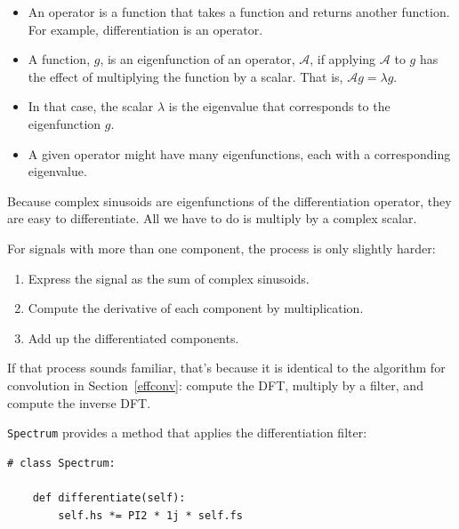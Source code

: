 \documentclass[12pt]{book}
\begin{document}
\newcommand{\op}{\mathcal{A}}

\begin{itemize}

\item An operator is a function that takes a function and returns
another function.  For example, differentiation is an operator.

\item A function, $g$, is an eigenfunction of an operator, $\op$, if
applying $\op$ to $g$ has the effect of multiplying the function by
a scalar.  That is, $\op g = \lambda g$.

\item In that case, the scalar $\lambda$ is the eigenvalue that
corresponds to the eigenfunction $g$.

\item A given operator might have many eigenfunctions, each with
a corresponding eigenvalue.

\end{itemize}

Because complex sinusoids are eigenfunctions of the differentiation
operator, they are easy to differentiate.  All we have to do is
multiply by a complex scalar.

For signals with more than one
component, the process is only slightly harder:

\begin{enumerate}

\item Express the signal as the sum of complex sinusoids.

\item Compute the derivative of each component by multiplication.

\item Add up the differentiated components.

\end{enumerate}

If that process sounds familiar, that's because it is identical
to the algorithm for convolution in Section~\ref{effconv}: compute
the DFT, multiply by a filter, and compute the inverse DFT.

{\tt Spectrum} provides a method that applies the differentiation
filter:

\begin{verbatim}
# class Spectrum:

    def differentiate(self):
        self.hs *= PI2 * 1j * self.fs
\end{verbatim}
\end{document}
